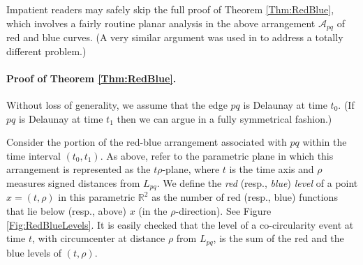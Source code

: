 \documentclass[letter,11pt]{article}
\def\A{\mathcal{A}}
\def \reals{{\mathbb R}}
\def \L{{L}}
\begin{document}
Impatient readers may safely skip the full proof of Theorem \ref{Thm:RedBlue}, which involves a fairly routine 
planar analysis in the above arrangement $\A_{pq}$ of red and blue curves. (A very similar argument was used in \cite{ASS} to address a totally different problem.)


\paragraph{Proof of Theorem \ref{Thm:RedBlue}.}
Without loss of generality, we assume that the edge $pq$ is Delaunay at time $t_0$. (If $pq$ is Delaunay at time $t_1$ then we can argue in a fully symmetrical fashion.)

Consider the portion of the red-blue arrangement associated with $pq$ within the time interval $(t_0,t_1)$. As above, refer to the parametric plane in which this arrangement is represented as the $t\rho$-plane, where $t$ is the time axis and $\rho$ measures signed distances  from $\L_{pq}$.
We define the {\it red} (resp., {\it blue}) {\it level} of a point $x=(t,\rho)$ in this parametric $\reals^2$ as the number of red (resp., blue) functions that lie below (resp., above) $x$ (in the $\rho$-direction). See Figure \ref{Fig:RedBlueLevels}.
It is easily checked that the level of a co-circularity event at time $t$, with circumcenter at distance $\rho$ from $\L_{pq}$, is the sum of the red and the blue levels of $(t,\rho)$.
\end{document}
